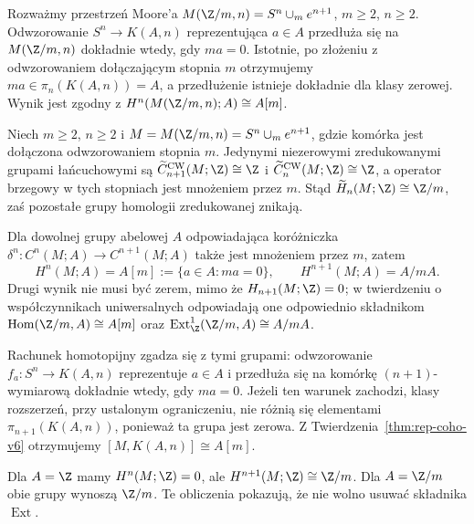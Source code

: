 \begin{przyklad}
Rozważmy przestrzeń Moore'a
$M(\Z/m,n)=S^n\cup_{m}e^{n+1}$,
$m\ge2$, $n\ge2$. Odwzorowanie $S^n\to K(A,n)$
reprezentująca $a\in A$ przedłuża się na
$M(\Z/m,n)$ dokładnie wtedy, gdy $ma=0$.
Istotnie, po złożeniu z odwzorowaniem dołączającym stopnia $m$
otrzymujemy $ma\in\pi_n(K(A,n))=A$, a przedłużenie
istnieje dokładnie dla klasy zerowej. Wynik jest zgodny
z $H^n(M(\Z/m,n);A)\cong A[m]$.
\end{przyklad}


\begin{przyklad}
\label{prz:moore-cohomology-Hom-Ext-v6}
Niech $m\ge2$, $n\ge2$ i
$M=M(\Z/m,n)=S^n\cup_m e^{n+1}$, gdzie komórka jest
dołączona odwzorowaniem stopnia $m$. Jedynymi
niezerowymi zredukowanymi grupami łańcuchowymi są
$\widetilde C_{n+1}^{\mathrm{CW}}(M;\Z)\cong\Z$
i $\widetilde C_n^{\mathrm{CW}}(M;\Z)\cong\Z$,
a operator brzegowy w tych stopniach jest mnożeniem przez $m$.
Stąd $\widetilde H_n(M;\Z)\cong\Z/m$, zaś pozostałe
grupy homologii zredukowanej znikają.

Dla dowolnej grupy abelowej $A$ odpowiadająca
koróżniczka $\delta^n:C^n(M;A)\to C^{n+1}(M;A)$
także jest mnożeniem przez $m$, zatem
\[
H^n(M;A)=A[m]:=\{a\in A:ma=0\},\qquad
H^{n+1}(M;A)=A/mA.
\]
Drugi wynik nie musi być zerem, mimo że
$H_{n+1}(M;\Z)=0$; w twierdzeniu o współczynnikach
uniwersalnych odpowiadają one odpowiednio składnikom
$\operatorname{Hom}(\Z/m,A)\cong A[m]$ oraz
$\operatorname{Ext}^1_{\Z}(\Z/m,A)\cong A/mA$.

Rachunek homotopijny zgadza się z tymi grupami:
odwzorowanie $f_a:S^n\to K(A,n)$ reprezentuje
$a\in A$ i przedłuża się na komórkę $(n+1)$-wymiarową
dokładnie wtedy, gdy $ma=0$. Jeżeli ten warunek zachodzi,
klasy rozszerzeń, przy ustalonym ograniczeniu, nie różnią
się elementami $\pi_{n+1}(K(A,n))$, ponieważ ta grupa
jest zerowa. Z Twierdzenia~\ref{thm:rep-coho-v6}
otrzymujemy $[M,K(A,n)]\cong A[m]$.

Dla $A=\Z$ mamy $H^n(M;\Z)=0$, ale
$H^{n+1}(M;\Z)\cong\Z/m$. Dla $A=\Z/m$
obie grupy wynoszą $\Z/m$. Te obliczenia pokazują,
że nie wolno usuwać składnika $\operatorname{Ext}$.
\end{przyklad}

